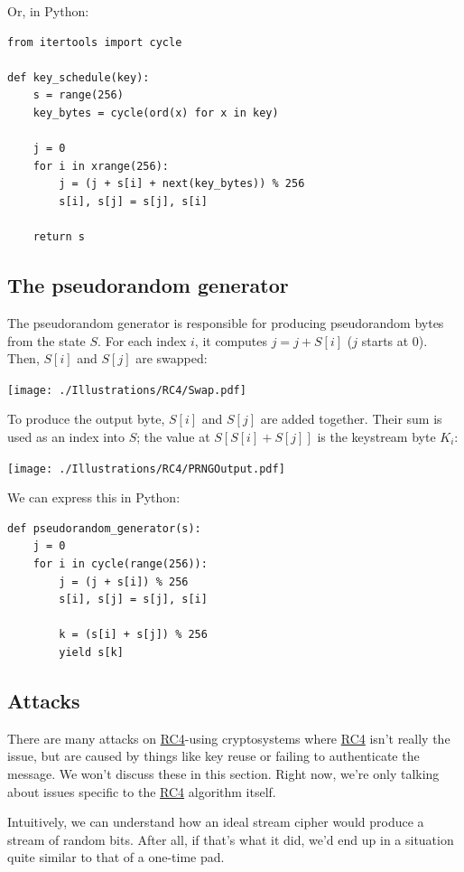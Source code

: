 \documentclass[11pt,ebook,table,dvipsnames]{memoir}
\begin{document}
Or, in Python:

\begin{verbatim}
from itertools import cycle

def key_schedule(key):
    s = range(256)
    key_bytes = cycle(ord(x) for x in key)

    j = 0
    for i in xrange(256):
        j = (j + s[i] + next(key_bytes)) % 256
        s[i], s[j] = s[j], s[i]

    return s
\end{verbatim}
\subsection{The pseudorandom generator}
\label{sec-2-3-9-2}

The pseudorandom generator is responsible for producing pseudorandom
bytes from the state $S$. For each index $i$, it computes $j = j +
S[i]$ ($j$ starts at 0). Then, $S[i]$ and $S[j]$ are swapped:

\texttt{[image: ./Illustrations/RC4/Swap.pdf]}

To produce the output byte, $S[i]$ and $S[j]$ are added together.
Their sum is used as an index into $S$; the value at $S[S[i] + S[j]]$
is the keystream byte $K_i$:

\texttt{[image: ./Illustrations/RC4/PRNGOutput.pdf]}

We can express this in Python:

\begin{verbatim}
def pseudorandom_generator(s):
    j = 0
    for i in cycle(range(256)):
        j = (j + s[i]) % 256
        s[i], s[j] = s[j], s[i]

        k = (s[i] + s[j]) % 256
        yield s[k]
\end{verbatim}
\subsection{Attacks}
\label{sec-2-3-9-3}

There are many attacks on \hyperref[RC4]{RC4}-using cryptosystems where \hyperref[RC4]{RC4} isn't
really the issue, but are caused by things like key reuse or failing
to authenticate the message. We won't discuss these in this section.
Right now, we're only talking about issues specific to the \hyperref[RC4]{RC4}
algorithm itself.

Intuitively, we can understand how an ideal stream cipher would
produce a stream of random bits. After all, if that's what it did,
we'd end up in a situation quite similar to that of a one-time pad.
\end{document}
